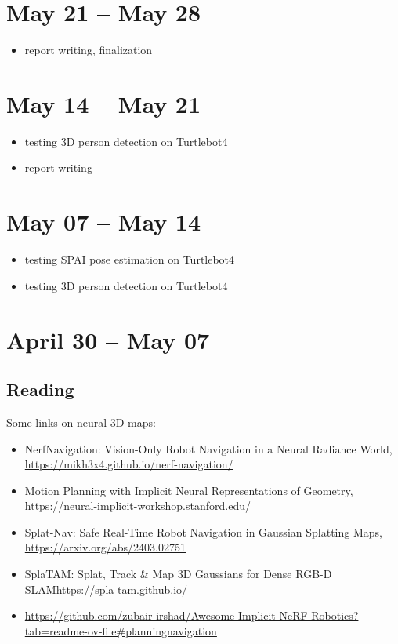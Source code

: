 \documentclass{article}
\begin{document}
\section{May 21 -- May 28}
\begin{itemize}
\item report writing, finalization 
\end{itemize}

\section{May 14 -- May 21}
\begin{itemize}
\item testing 3D person detection on Turtlebot4 
\item report writing 
\end{itemize}


\section{May 07 -- May 14}
\begin{itemize}
\item testing SPAI pose estimation on Turtlebot4 
\item testing 3D person detection on Turtlebot4 
\end{itemize}
\newpage

\section{April 30 -- May 07}
\subsection{Reading}
Some links on neural 3D maps:
\begin{itemize}
\item NerfNavigation: Vision-Only Robot Navigation in a Neural Radiance World, \url{https://mikh3x4.github.io/nerf-navigation/} 
\item Motion Planning with Implicit Neural Representations of Geometry, \url{https://neural-implicit-workshop.stanford.edu/} 
\item Splat-Nav: Safe Real-Time Robot Navigation in Gaussian Splatting Maps, \url{https://arxiv.org/abs/2403.02751} 
\item SplaTAM: Splat, Track \& Map 3D Gaussians for Dense RGB-D SLAM\url{https://spla-tam.github.io/} 
\item \url{https://github.com/zubair-irshad/Awesome-Implicit-NeRF-Robotics?tab=readme-ov-file#planningnavigation}
\end{itemize}
\newpage
\end{document}
